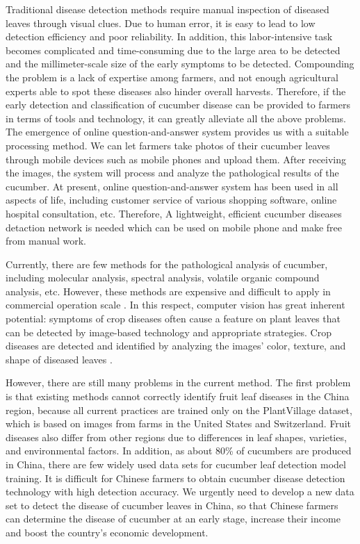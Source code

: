 \documentclass[a4paper,fleqn]{cas-sc}
\begin{document}
Traditional disease detection methods require manual inspection of diseased leaves through visual clues. Due to human error, it is easy to lead to low detection efficiency and poor reliability. In addition, this labor-intensive task becomes complicated and time-consuming due to the large area to be detected and the millimeter-scale size of the early symptoms to be detected. Compounding the problem is a lack of expertise among farmers, and not enough agricultural experts able to spot these diseases also hinder overall harvests. Therefore, if the early detection and classification of cucumber disease can be provided to farmers in terms of tools and technology, it can greatly alleviate all the above problems. 
The emergence of online question-and-answer system provides us with a suitable processing method. We can let farmers take photos of their cucumber leaves through mobile devices such as mobile phones and upload them. After receiving the images, the system will process and analyze the pathological results of the cucumber. At present, online question-and-answer system has been used in all aspects of life, including customer service of various shopping software, online hospital consultation, etc.  Therefore, A lightweight, efficient cucumber diseases detaction network is needed which can be used on mobile phone and make free from manual work. 

Currently, there are few methods for the pathological analysis of cucumber, including molecular analysis, spectral analysis, volatile organic compound analysis, etc. However, these methods are expensive and difficult to apply in commercial operation scale \citep{martinelli2015advanced} . In this respect, computer vision has great inherent potential: symptoms of crop diseases often cause a feature on plant leaves that can be detected by image-based technology and appropriate strategies. Crop diseases are detected and identified by analyzing the images' color, texture, and shape of diseased leaves \citep{benfenati2021unsupervised}. 

However, there are still many problems in the current method. The first problem is that existing methods cannot correctly identify fruit leaf diseases in the China region, because all current practices are trained only on the PlantVillage dataset, which is based on images from farms in the United States and Switzerland. Fruit diseases also differ from other regions due to differences in leaf shapes, varieties, and environmental factors. In addition, as about 80\% of cucumbers are produced in China, there are few widely used data sets for cucumber leaf detection model training. It is difficult for Chinese farmers to obtain cucumber disease detection technology with high detection accuracy. We urgently need to develop a new data set to detect the disease of cucumber leaves in China, so that Chinese farmers can determine the disease of cucumber at an early stage, increase their income and boost the country's economic development.
\end{document}
